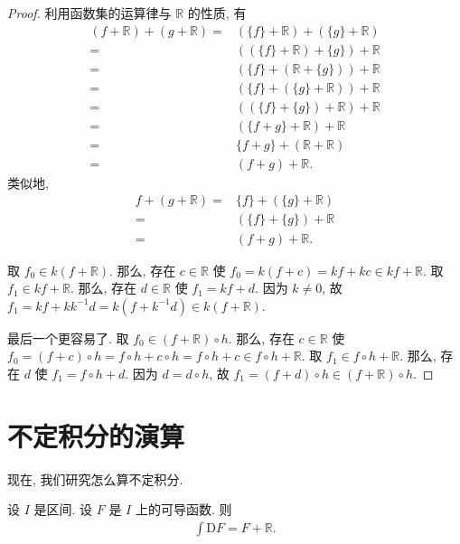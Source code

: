 \begin{proof}
    利用函数集的运算律与 $\mathbb{R}$ 的性质, 有
    \begin{align*}
        (f + \mathbb{R}) + (g + \mathbb{R})
        = {} & (\{ f \} + \mathbb{R}) + (\{ g \} + \mathbb{R}) \\
        = {} & ((\{ f \} + \mathbb{R}) + \{ g \}) + \mathbb{R} \\
        = {} & (\{ f \} + (\mathbb{R} + \{ g \})) + \mathbb{R} \\
        = {} & (\{ f \} + (\{ g \} + \mathbb{R})) + \mathbb{R} \\
        = {} & ((\{ f \} + \{ g \}) + \mathbb{R}) + \mathbb{R} \\
        = {} & (\{ f + g \} + \mathbb{R}) + \mathbb{R}         \\
        = {} & \{ f + g \} + (\mathbb{R} + \mathbb{R})         \\
        = {} & (f + g) + \mathbb{R}.
    \end{align*}
    类似地,
    \begin{align*}
        f + (g + \mathbb{R})
        = {} & \{ f \} + (\{ g \} + \mathbb{R}) \\
        = {} & (\{ f \} + \{ g \}) + \mathbb{R} \\
        = {} & (f + g) + \mathbb{R}.
    \end{align*}

    取 $f_0 \in k(f + \mathbb{R})$.
    那么, 存在 $c \in \mathbb{R}$ 使
    $f_0 = k(f + c) = kf + kc \in kf + \mathbb{R}$.
    取 $f_1 \in kf + \mathbb{R}$.
    那么, 存在 $d \in \mathbb{R}$ 使 $f_1 = kf + d$.
    因为 $k \neq 0$,
    故 $f_1 = kf + kk^{-1}d = k(f + k^{-1}d) \in k(f + \mathbb{R})$.

    最后一个更容易了.
    取 $f_0 \in (f + \mathbb{R}) \circ h$.
    那么, 存在 $c \in \mathbb{R}$ 使
    $f_0 = (f + c) \circ h = f \circ h + c \circ h = f \circ h + c \in f \circ h + \mathbb{R}$.
    取 $f_1 \in f \circ h + \mathbb{R}$.
    那么, 存在 $d$ 使 $f_1 = f \circ h + d$.
    因为 $d = d \circ h$,
    故 $f_1 = (f + d) \circ h \in (f + \mathbb{R}) \circ h$.
\end{proof}

\section{不定积分的演算}

现在, 我们研究怎么算不定积分.

\begin{theorem}
    设 $I$ 是区间.
    设 $F$ 是 $I$ 上的可导函数.
    则
    \begin{align*}
        \int {\mathrm{D}F} = F + \mathbb{R}.
    \end{align*}
\end{theorem}

